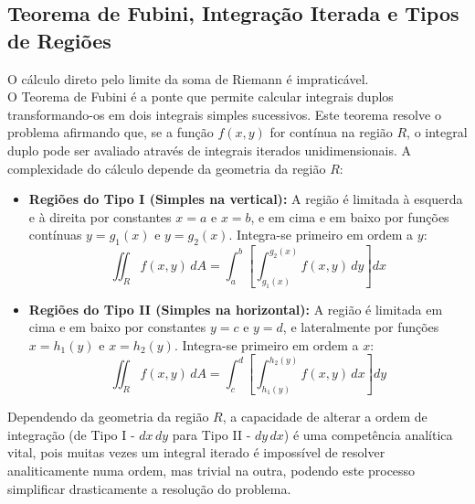 \documentclass[12pt,a4paper]{article}
\begin{document}
\subsection{Teorema de Fubini, Integração Iterada e Tipos de Regiões}
O cálculo direto pelo limite da soma de Riemann é impraticável. \\ O Teorema de Fubini é a ponte que permite calcular integrais duplos transformando-os em dois integrais simples sucessivos. 
Este teorema resolve o problema afirmando que, se a função $f(x,y)$ for contínua na região 
$R$, o integral duplo pode ser avaliado através de integrais iterados unidimensionais. A complexidade do cálculo depende da geometria da região $R$:
\begin{itemize}
    \item \textbf{Regiões do Tipo I (Simples na vertical):} A região é limitada à esquerda e à direita por constantes $x=a$ e $x=b$, e em cima e em baixo por funções 
	contínuas $y=g_1(x)$ e $y=g_2(x)$. Integra-se primeiro em ordem a $y$:
    \begin{equation}
        \iint_R f(x,y) \,dA = \int_{a}^{b} \left[ \int_{g_1(x)}^{g_2(x)} f(x,y) \,dy \right] dx
    \end{equation}
    
    \item \textbf{Regiões do Tipo II (Simples na horizontal):} A região é limitada em cima e em baixo por constantes $y=c$ e $y=d$, e lateralmente por funções 
	$x=h_1(y)$ e $x=h_2(y)$. Integra-se primeiro em ordem a $x$:
    \begin{equation}
        \iint_R f(x,y) \,dA = \int_{c}^{d} \left[ \int_{h_1(y)}^{h_2(y)} f(x,y) \,dx \right] dy
    \end{equation}
\end{itemize}
Dependendo da geometria da região $R$, a capacidade de alterar a ordem de integração (de Tipo I - $dx\,dy$ para Tipo II - $dy\,dx$) é uma competência analítica vital, pois muitas vezes um integral iterado é impossível 
de resolver analiticamente numa ordem, mas trivial na outra, podendo este processo simplificar drasticamente a resolução do problema.
\end{document}
